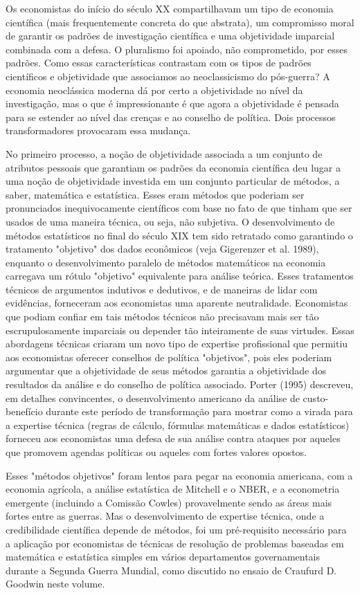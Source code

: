 \documentclass[a4paper,12pt]{article}[abntex2]
\begin{document}
Os economistas do início do século XX compartilhavam um tipo de economia científica (mais frequentemente concreta do que abstrata), um compromisso moral de garantir os padrões de investigação científica e uma objetividade imparcial combinada com a defesa. O pluralismo foi apoiado, não comprometido, por esses padrões. Como essas características contrastam com os tipos de padrões científicos e objetividade que associamos ao neoclassicismo do pós-guerra? A economia neoclássica moderna dá por certo a objetividade no nível da investigação, mas o que é impressionante é que agora a objetividade é pensada para se estender ao nível das crenças e ao conselho de política. Dois processos transformadores provocaram essa mudança.

No primeiro processo, a noção de objetividade associada a um conjunto de atributos pessoais que garantiam os padrões da economia científica deu lugar a uma noção de objetividade investida em um conjunto particular de métodos, a saber, matemática e estatística. Esses eram métodos que poderiam ser pronunciados inequivocamente científicos com base no fato de que tinham que ser usados de uma maneira técnica, ou seja, não subjetiva. O desenvolvimento de métodos estatísticos no final do século XIX tem sido retratado como garantindo o tratamento "objetivo" dos dados econômicos (veja Gigerenzer et al. 1989), enquanto o desenvolvimento paralelo de métodos matemáticos na economia carregava um rótulo "objetivo" equivalente para análise teórica. Esses tratamentos técnicos de argumentos indutivos e dedutivos, e de maneiras de lidar com evidências, forneceram aos economistas uma aparente neutralidade. Economistas que podiam confiar em tais métodos técnicos não precisavam mais ser tão escrupulosamente imparciais ou depender tão inteiramente de suas virtudes. Essas abordagens técnicas criaram um novo tipo de expertise profissional que permitiu aos economistas oferecer conselhos de política "objetivos", pois eles poderiam argumentar que a objetividade de seus métodos garantia a objetividade dos resultados da análise e do conselho de política associado. Porter (1995) descreveu, em detalhes convincentes, o desenvolvimento americano da análise de custo-benefício durante este período de transformação para mostrar como a virada para a expertise técnica (regras de cálculo, fórmulas matemáticas e dados estatísticos) forneceu aos economistas uma defesa de sua análise contra ataques por aqueles que promovem agendas políticas ou aqueles com fortes valores opostos.

Esses "métodos objetivos" foram lentos para pegar na economia americana, com a economia agrícola, a análise estatística de Mitchell e o NBER, e a econometria emergente (incluindo a Comissão Cowles) provavelmente sendo as áreas mais fortes entre as guerras. Mas o desenvolvimento de expertise técnica, onde a credibilidade científica depende de métodos, foi um pré-requisito necessário para a aplicação por economistas de técnicas de resolução de problemas baseadas em matemática e estatística simples em vários departamentos governamentais durante a Segunda Guerra Mundial, como discutido no ensaio de Craufurd D. Goodwin neste volume.
\end{document}
